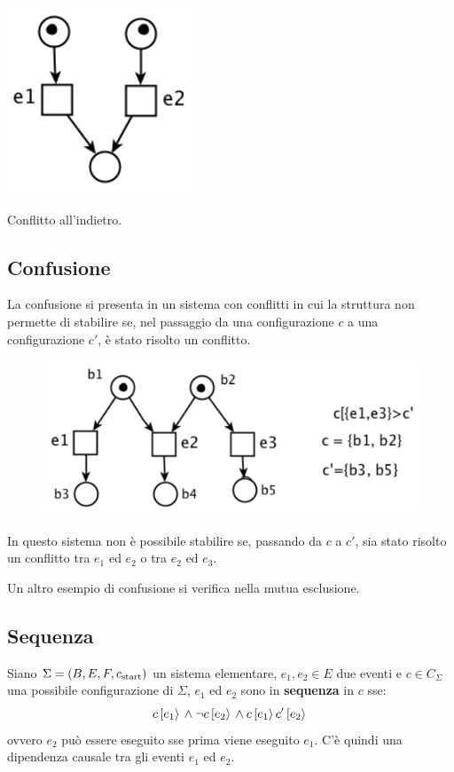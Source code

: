 \begin{defn}
    \begin{marginfigure}[-3cm]
        \includegraphics[width=0.75\linewidth]{img/conflitto_indietro.png}
        \caption{Conflitto all'indietro.}
        \label{fig:conflitto_indietro}
    \end{marginfigure}
\end{defn}

\subsection{Confusione}
La confusione si presenta in un sistema con conflitti in cui la struttura non permette di stabilire se, nel passaggio da una configurazione $c$ a una configurazione $c'$, è stato risolto un conflitto.

\begin{figure}
    \centering
    \includegraphics[width=0.5\linewidth]{img/confusione.png}
    \label{fig:confusione}
\end{figure}
In questo sistema non è possibile stabilire se, passando da $c$ a $c'$, sia stato risolto un conflitto tra $e_1$ ed $e_2$ o tra $e_2$ ed $e_3$.

Un altro esempio di confusione si verifica nella mutua esclusione.

\subsection{Sequenza}
Siano $\Sigma = (B, E, F, c_{\textnormal{start}})$ un sistema elementare, $e_1, e_2 \in E$ due eventi e $c \in C_{\Sigma}$ una possibile configurazione di $\Sigma$, $e_1$ ed $e_2$ sono in \textbf{sequenza} in $c$ sse:
\[
    c\,[e_1\rangle\, \land \lnot c\,[e_2\rangle\, \land c\,[e_1\rangle\,c'\,[e_2\rangle\,\]
ovvero $e_2$ può essere eseguito sse prima viene eseguito $e_1$.
C'è quindi una dipendenza causale tra gli eventi $e_1$ ed $e_2$.

